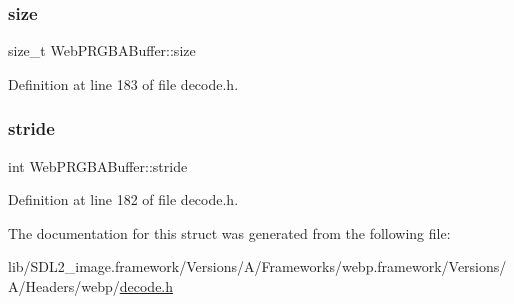 \subsubsection{\texorpdfstring{size}{size}}
{\footnotesize\ttfamily size\+\_\+t Web\+P\+R\+G\+B\+A\+Buffer\+::size}



Definition at line 183 of file decode.\+h.

\mbox{\label{struct_web_p_r_g_b_a_buffer_a571fb2a14b6c081aff2076e6e903b874}} 
\subsubsection{\texorpdfstring{stride}{stride}}
{\footnotesize\ttfamily int Web\+P\+R\+G\+B\+A\+Buffer\+::stride}



Definition at line 182 of file decode.\+h.



The documentation for this struct was generated from the following file\+:\begin{DoxyCompactItemize}
\item 
lib/\+S\+D\+L2\+\_\+image.\+framework/\+Versions/\+A/\+Frameworks/webp.\+framework/\+Versions/\+A/\+Headers/webp/\mbox{\hyperlink{decode_8h}{decode.\+h}}\end{DoxyCompactItemize}
